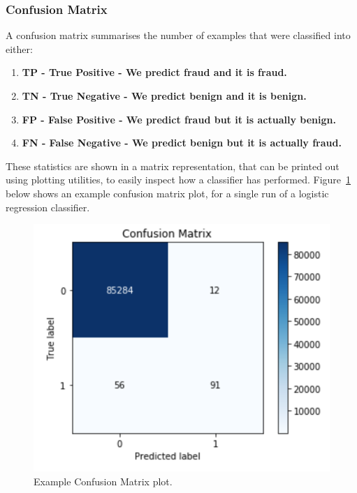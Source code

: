\documentclass[12pt,a4paper,twoside]{report}
\begin{document}
\subsubsection{Confusion Matrix}

A confusion matrix summarises the number of examples that were classified into either:\\
\begin{enumerate}
\item \textbf{TP - True Positive - We predict fraud and it is fraud.}
\item \textbf{TN - True Negative - We predict benign and it is benign.}
\item \textbf{FP - False Positive - We predict fraud but it is actually benign.}
\item \textbf{FN - False Negative - We predict benign but it is actually fraud.}

\end{enumerate}

These statistics are shown in a matrix representation, that can be printed out using plotting utilities, to easily inspect how a classifier has performed. Figure~\ref{fig:cm-example} below shows an example confusion matrix plot, for a single run of a logistic regression classifier. 

\begin{figure}[H]
\centering
\includegraphics[scale=0.6]{cm-example}
\caption{Example Confusion Matrix plot.}
\label{fig:cm-example}
\end{figure}
\end{document}
